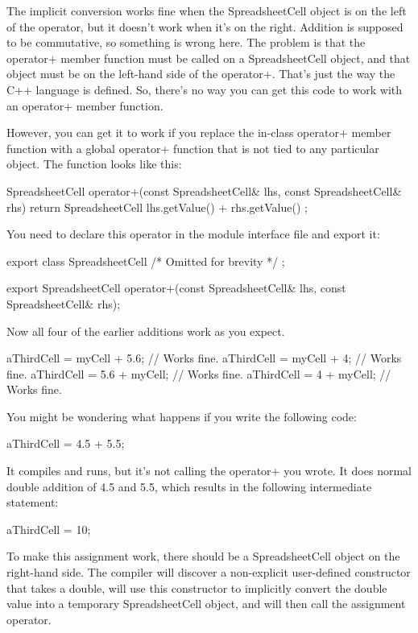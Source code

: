 The implicit conversion works fine when the SpreadsheetCell object is on the left of the operator, but it doesn’t work when it’s on the right. Addition is supposed to be commutative, so something is wrong here. The problem is that the operator+ member function must be called on a SpreadsheetCell object, and that object must be on the left-hand side of the operator+. That’s just the way the C++ language is defined. So, there’s no way you can get this code to work with an operator+ member function.

However, you can get it to work if you replace the in-class operator+ member function with a global operator+ function that is not tied to any particular object. The function looks like this:

\begin{cpp}
SpreadsheetCell operator+(const SpreadsheetCell& lhs,
    const SpreadsheetCell& rhs)
{
    return SpreadsheetCell { lhs.getValue() + rhs.getValue() };
}
\end{cpp}

You need to declare this operator in the module interface file and export it:

\begin{cpp}
export class SpreadsheetCell { /* Omitted for brevity */ };

export SpreadsheetCell operator+(const SpreadsheetCell& lhs,
    const SpreadsheetCell& rhs);
\end{cpp}

Now all four of the earlier additions work as you expect.

\begin{cpp}
aThirdCell = myCell + 5.6; // Works fine.
aThirdCell = myCell + 4; // Works fine.
aThirdCell = 5.6 + myCell; // Works fine.
aThirdCell = 4 + myCell; // Works fine.
\end{cpp}

You might be wondering what happens if you write the following code:

\begin{cpp}
aThirdCell = 4.5 + 5.5;
\end{cpp}

It compiles and runs, but it’s not calling the operator+ you wrote. It does normal double addition of 4.5 and 5.5, which results in the following intermediate statement:

\begin{cpp}
aThirdCell = 10;
\end{cpp}

To make this assignment work, there should be a SpreadsheetCell object on the right-hand side. The compiler will discover a non-explicit user-defined constructor that takes a double, will use this constructor to implicitly convert the double value into a temporary SpreadsheetCell object, and will then call the assignment operator.

